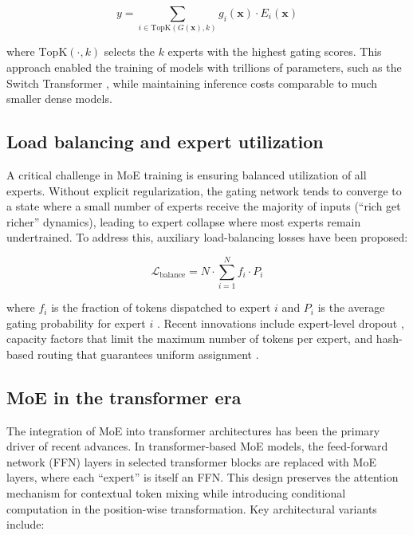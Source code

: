 \begin{equation}
    y = \sum_{i \in \text{TopK}(G(\mathbf{x}), k)} g_i(\mathbf{x}) \cdot E_i(\mathbf{x})
\end{equation}

\noindent where $\text{TopK}(\cdot, k)$ selects the $k$ experts with the highest gating scores. This approach enabled the training of models with trillions of parameters, such as the Switch Transformer \cite{fedus2022switch}, while maintaining inference costs comparable to much smaller dense models.

\subsection*{Load balancing and expert utilization}

A critical challenge in MoE training is ensuring balanced utilization of all experts. Without explicit regularization, the gating network tends to converge to a state where a small number of experts receive the majority of inputs (``rich get richer'' dynamics), leading to expert collapse where most experts remain undertrained. To address this, auxiliary load-balancing losses have been proposed:

\begin{equation}
    \mathcal{L}_{\text{balance}} = N \cdot \sum_{i=1}^{N} f_i \cdot P_i
\end{equation}

\noindent where $f_i$ is the fraction of tokens dispatched to expert $i$ and $P_i$ is the average gating probability for expert $i$ \cite{fedus2022switch}. Recent innovations include expert-level dropout \cite{zoph2022st}, capacity factors that limit the maximum number of tokens per expert, and hash-based routing that guarantees uniform assignment \cite{roller2021hash}.

\subsection*{MoE in the transformer era}

The integration of MoE into transformer architectures \cite{vaswani2017attention} has been the primary driver of recent advances. In transformer-based MoE models, the feed-forward network (FFN) layers in selected transformer blocks are replaced with MoE layers, where each ``expert'' is itself an FFN. This design preserves the attention mechanism for contextual token mixing while introducing conditional computation in the position-wise transformation. Key architectural variants include:

